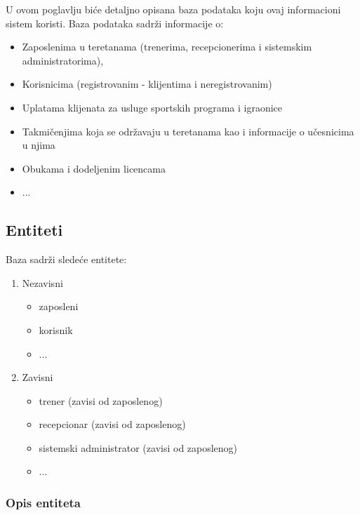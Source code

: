 \documentclass[../main.tex]{subfiles}
\begin{document}
U ovom poglavlju biće detaljno opisana baza podataka koju ovaj informacioni sistem koristi. Baza podataka sadrži informacije o:
\begin{itemize}
    \item Zaposlenima u teretanama (trenerima, recepcionerima i sistemskim administratorima),
    \item Korisnicima (registrovanim - klijentima i neregistrovanim)
    \item Uplatama klijenata za usluge sportskih programa i igraonice
    \item Takmičenjima koja se održavaju u teretanama kao i informacije o učesnicima u njima
    \item Obukama i dodeljenim licencama
    \item ...
\end{itemize}

\subsection{Entiteti}
Baza sadrži sledeće entitete:
\begin{enumerate}
    \item Nezavisni
        \begin{itemize}
            \item zaposleni
            \item korisnik
            \item ...
        \end{itemize}
    \item Zavisni
        \begin{itemize}
            \item trener (zavisi od zaposlenog)
            \item recepcionar (zavisi od zaposlenog)
            \item sistemski administrator (zavisi od zaposlenog)
            \item ...
        \end{itemize}
\end{enumerate}


\subsubsection{Opis entiteta}
\end{document}
